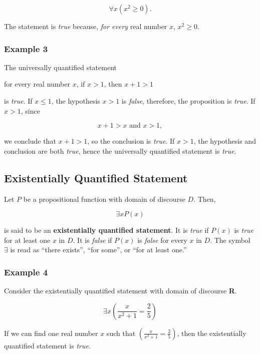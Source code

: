 \[
    \forall x (x^2 \geq 0).
\]

The statement is \textit{true} because, \textit{for every} real number $x$, $x^2 \geq 0$.

\subsubsection*{Example 3}

The universally quantified statement
\begin{center}
    for every real number $x$, if $x > 1$, then $x + 1 > 1$
\end{center}

is \textit{true}.  If $x \leq 1$, the hypothesis $x > 1$ is \textit{false}, therefore, the proposition is \textit{true}.  If $x > 1$, since

\[
    x + 1 > x \text{ and } x > 1,    
\]

we conclude that $x + 1 > 1$, so the conclusion is \textit{true}.  If $x > 1$, the hypothesis and conclusion are both \textit{true}, hence the universally quantified statement is \textit{true}.

\subsection*{Existentially Quantified Statement}

Let $P$ be a propositional function with domain of discourse $D$.  Then,

\[
    \exists x P(x)
\]

is said to be an \textbf{existentially quantified statement}.  It is \textit{true} if $P(x)$ is \textit{true} for at least one $x$ in $D$.  It is \textit{false} if $P(x)$ is \textit{false} for every $x$ in $D$.  The symbol $\exists$ is read as ``there exists'', ``for some'', or ``for at least one.''

\subsubsection*{Example 4}

Consider the existentially quantified statement with domain of discourse \textbf{R}.

\[
    \exists x \left( \frac{x}{x^2 + 1} = \frac{2}{5} \right)
\]

If we can find one real number $x$ such that $\left(\frac{x}{x^2 + 1} = \frac{2}{5}\right)$, then the existentially quantified statement is \textit{true}.\\


